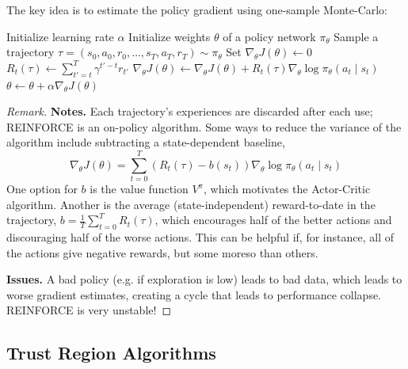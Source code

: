 \documentclass[11pt, letterpaper]{article}
\newenvironment{remark}
    {\renewcommand\qedsymbol{\(\blacksquare\)}\begin{proof}[Remark]}
    {\end{proof}}
\begin{document}
\begin{concept}
    The key idea is to estimate the policy gradient using one-sample Monte-Carlo:
    \begin{algorithm}[H]
    \caption*{REINFORCE Algorithm}
    \begin{algorithmic}[1]
    \State Initialize learning rate \(\alpha\)
    \State Initialize weights \(\theta\) of a policy network \(\pi_\theta\)
        \State Sample a trajectory \(\tau = (s_0, a_0, r_0, \dots, s_T, a_T, r_T) \sim \pi_\theta\)
        \State Set \(\nabla_\theta J(\theta) \leftarrow 0\)
            \State \(R_t(\tau) \leftarrow \sum_{t'=t}^T \gamma^{t'-t} r_{t'}\)
            \State \(\nabla_\theta J(\theta) \leftarrow \nabla_\theta J(\theta) + R_t(\tau) \nabla_\theta \log \pi_\theta(a_t \mid s_t)\)
        \EndFor
        \State \(\theta \leftarrow \theta + \alpha \nabla_\theta J(\theta)\)
    \EndFor
    \end{algorithmic}
    \end{algorithm}
\end{concept}

\begin{remark}
    \textbf{Notes.} Each trajectory's experiences are discarded after each use; REINFORCE is an on-policy algorithm. Some ways to reduce the variance of the algorithm include subtracting a state-dependent baseline, 
    \[
        \nabla_\theta J(\theta) = \sum_{t=0}^T (R_t(\tau) - b(s_t)) \nabla_\theta \log \pi_\theta(a_t \mid s_t)
    \]
    One option for \(b\) is the value function \(V^\pi\), which motivates the Actor-Critic algorithm. Another is the average (state-independent) reward-to-date in the trajectory, \(b = \frac{1}{T} \sum_{t=0}^T R_t(\tau)\), which encourages half of the better actions and discouraging half of the worse actions. This can be helpful if, for instance, all of the actions give negative rewards, but some moreso than others.

    \textbf{Issues.} A bad policy (e.g. if exploration is low) leads to bad data, which leads to worse gradient estimates, creating a cycle that leads to performance collapse. REINFORCE is very unstable! 
\end{remark}

\subsection{Trust Region Algorithms}
\end{document}
